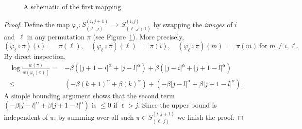 \documentclass{article}
\begin{document}
\begin{figure}
\centering{}
    \caption{A schematic of the first mapping. }
    \label{fig:firstmap}
\end{figure}
\begin{proof}
Define the map $\varphi_\ell: S^{(i,j+1)}_{(\ell,j)} \,\to\, S^{(i,j)}_{(\ell,j+1)}$ by swapping the \emph{images} of $i$ and~$\ell$ in any permutation $\pi$ (see Figure~\ref{fig:firstmap}).  More precisely,
\[
  (\varphi_\ell \circ \pi)(i) \;=\;\pi(\ell), 
  \quad
  (\varphi_\ell  \circ\pi)(\ell)\;=\;\pi(i),
  \quad
  (\varphi_\ell  \circ\pi)(m)\;=\;\pi(m)\ \text{for }m\neq i,\ell.\]
By direct inspection,
    \begin{align}
       \log \frac{w(\pi)}{w(\varphi_l(\pi))} = &-\beta\left(|j+1-i|^\alpha +|j-l|^\alpha\right)
    +\beta\left(|j-i|^\alpha +|j+1-l|^\alpha \right)
       \\
       \leq& \left(-\beta (k+1)^\alpha +\beta(k)^\alpha \right) + 
       \left(-\beta|j-l|^\alpha + \beta|j+1-l|^\alpha\right).
    \end{align}
    A simple bounding argument shows that the second term $  \left(-\beta|j-l|^\alpha + \beta|j+1-l|^\alpha\right)$ is $\le 0$ if $\ell>j$. Since the upper bound is independent of $\pi$, by summing over all such $\pi\in S_{(\ell,j)}^{(i,j+1)}$ we finish the proof.
\end{proof}
\end{document}
